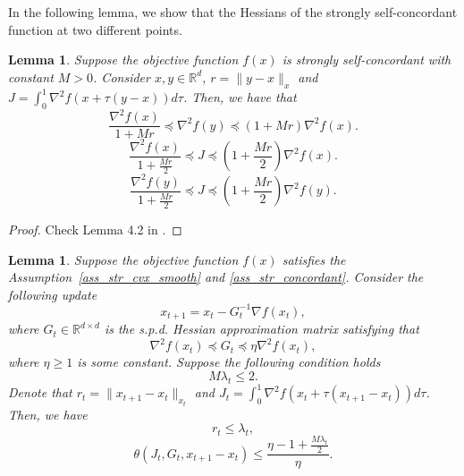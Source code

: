 \documentclass[11pt]{article}
\numberwithin{assumption}{section}
\numberwithin{remark}{section}
\numberwithin{theorem}{section}
\newtheorem{lemma}[theorem]{Lemma}
\begin{document}
In the following lemma, we show that the Hessians of the strongly self-concordant function at two different points.

\begin{lemma}\label{lemma_2}
Suppose the objective function $f(x)$ is strongly self-concordant with constant $M > 0$. Consider $x, y \in \mathbb{R}^d$, $r = \|y - x\|_x$ and $J = \int_{0}^{1}\nabla^2{f(x + \tau(y - x))}d\tau$. Then, we have that
\begin{equation}\label{lemma_2_1}
    \frac{\nabla^2{f(x)}}{1 + Mr} \preceq \nabla^2{f(y)} \preceq (1 + Mr)\nabla^2{f(x)}.
\end{equation}
\begin{equation}\label{lemma_2_2}
    \frac{\nabla^2{f(x)}}{1 + \frac{Mr}{2}} \preceq J \preceq (1 + \frac{Mr}{2})\nabla^2{f(x)}.
\end{equation}
\begin{equation}\label{lemma_2_3}
    \frac{\nabla^2{f(y)}}{1 + \frac{Mr}{2}} \preceq J \preceq (1 + \frac{Mr}{2})\nabla^2{f(y)}.
\end{equation}
\end{lemma}

\begin{proof}
Check Lemma 4.2 in \cite{rodomanov2020greedy}.
\end{proof}

\begin{lemma}\label{lemma_3}
Suppose the objective function $f(x)$ satisfies the Assumption~\ref{ass_str_cvx_smooth} and \ref{ass_str_concordant}. Consider the following update
\begin{equation}\label{lemma_3_1}
x_{t + 1} = x_t - G_t^{-1}\nabla{f(x_t)},
\end{equation}
where $G_{t} \in \mathbb{R}^{d \times d}$ is the s.p.d. Hessian approximation matrix satisfying that
\begin{equation}\label{lemma_3_2}
\nabla^2{f(x_t)} \preceq G_t \preceq \eta \nabla^2{f(x_t)},
\end{equation}
where $\eta \geq 1$ is some constant. Suppose the following condition holds
\begin{equation}\label{lemma_3_3}
    M\lambda_{t} \leq 2.
\end{equation}
Denote that $r_t = \|x_{t + 1} - x_t\|_{x_t}$ and $J_t = \int_{0}^{1}\nabla^2{f(x_t + \tau(x_{t + 1} - x_{t}))d\tau}$. Then, we have
\begin{equation}\label{lemma_3_4}
    r_t \leq \lambda_t,
\end{equation}
\begin{equation}\label{lemma_3_5}
    \theta(J_t, G_t, x_{t + 1} - x_{t}) \leq \frac{\eta - 1 + \frac{M\lambda_{t}}{2}}{\eta}.
\end{equation}
\end{lemma}
\end{document}
